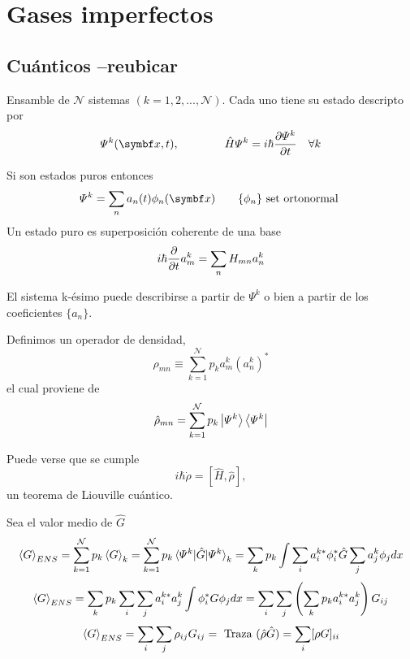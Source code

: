 \documentclass[10pt,oneside]{CBFT_book}
\begin{document}
\chapter{Gases imperfectos}


\section{Cuánticos --reubicar}

Ensamble de $ \mathcal{N} $ sistemas $(k=1,2,...,\mathcal{N})$. Cada uno tiene su estado descripto por 
\[
	\Psi^k(\vb{x},t), \qquad \qquad \hat{H} \Psi^k = i\hbar \dpar{\Psi^k}{t} \quad \forall k
\]

Si son estados puros entonces 
\[
	\Psi^k = \sum_n a_n(t) \phi_n(\vb{x}) \qquad \{ \phi_n \} \text{ set ortonormal }
\]
Un estado puro es superposición coherente de una base 
\[
	i \hbar \frac{\partial^{\hspace{-0.05em}} {}}{\partial {t}^{\hspace{-0.05em}}} a_m^k = \sum_n H_{mn}a_n^k
\]

El sistema k-ésimo puede describirse a partir de $ \Psi^k $ o bien a partir de los coeficientes $ \{ a_n \}$.

Definimos un operador de densidad,
\[
	\rho_{mn} \equiv \sum_{k=1}^{\mathcal{N}} p_k a_m^k (a_n^k)^*
\]
el cual proviene de 
\[
	\hat{\rho}_{mn} = \sum_{k=1}^{\mathcal{N}} p_k \Ket{\Psi^k}\Bra{\Psi^k}
\]

Puede verse que se cumple
\[
	i \hbar \dot{\rho} = [ \hat{H}, \hat{\rho} ],  
\]
un teorema de Liouville cuántico.
 
Sea el valor medio de $ \hat{G} $
\[
	\braket{G}_{ENS} = \sum_{k=1}^{\mathcal{N}} p_k \braket{G}_k = 
	\sum_{k=1}^{\mathcal{N}} p_k \braket{\Psi^k|\hat{G}|\Psi^k}_k = 
	\sum_k p_k \int \sum_i a_i^{k*}\phi_i^* \hat{G}\sum_j a_j^k\phi_j dx
\]
\[
	\braket{G}_{ENS} = \sum_k p_k \sum_i \sum_j a_i^{k*}  a_j^k \int \phi_i^* G \phi_j dx =
	\sum_i \sum_j \left( \sum_k p_k a_i^{k*}  a_j^k \right) G_{ij}
\]
\[
	\braket{G}_{ENS} = \sum_i \sum_j \rho_{ij} G_{ij} = 
	\text{ Traza }(\hat{\rho}\hat{G}) = \sum_i [\rho G]_{ii}
\]
\end{document}
